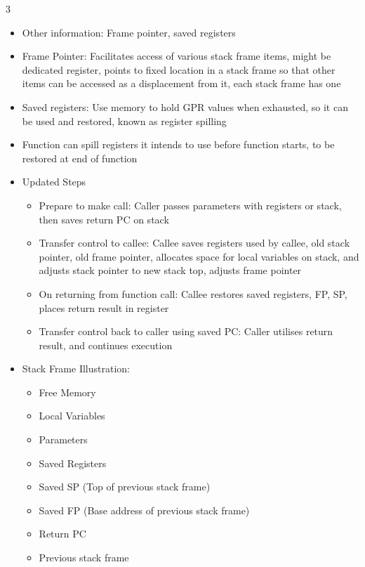 \documentclass[10pt, landscape]{article}
\begin{document}
\begin{multicols*}{3}
\begin{itemize}
    \item Other information: Frame pointer, saved registers
    \item Frame Pointer: Facilitates access of various stack frame items, might be dedicated register, points to fixed location in a stack frame so that other items can be accessed as a displacement from it, each stack frame has one
    \item Saved registers: Use memory to hold GPR values when exhausted, so it can be used and restored, known as register spilling
    \item Function can spill registers it intends to use before function starts, to be restored at end of function
    \item Updated Steps
    \begin{itemize}
        \item Prepare to make call: Caller passes parameters with registers or stack, then saves return PC on stack
        \item Transfer control to callee: Callee saves registers used by callee, old stack pointer, old frame pointer, allocates space for local variables on stack, and adjusts stack pointer to new stack top, adjusts frame pointer
        \item On returning from function call: Callee restores saved registers, FP, SP, places return result in register
        \item Transfer control back to caller using saved PC: Caller utilises return result, and continues execution
    \end{itemize}
    \item Stack Frame Illustration:
    \begin{itemize}
        \item Free Memory
        \item Local Variables
        \item Parameters
        \item Saved Registers
        \item Saved SP (Top of previous stack frame)
        \item Saved FP (Base address of previous stack frame)
        \item Return PC
        \item Previous stack frame
    \end{itemize}
\end{itemize}


\end{multicols*}
\end{document}

